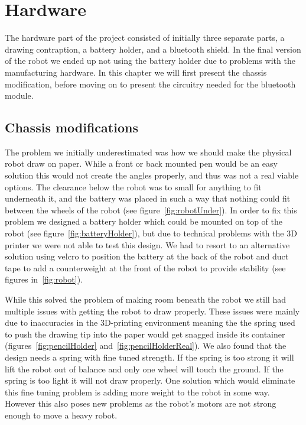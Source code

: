 \section{Hardware}\label{ch:hardware}
The hardware part of the project consisted of initially three separate parts, a drawing contraption, a battery holder, and a bluetooth shield. 
In the final version of the robot we ended up not using the battery holder due to problems with the manufacturing hardware. 
In this chapter we will first present the chassis modification, before moving on to present the circuitry needed for the bluetooth module. 

\subsection*{Chassis modifications}
The problem we initially underestimated was how we should make the physical robot draw on paper. While a front or back mounted pen would be an easy solution this would not create the angles properly, and thus was not a real viable options. The clearance below the robot was to small for anything to fit underneath it, and the battery was placed in such a way that nothing could fit between the wheels of the robot (see figure~\ref{fig:robotUnder}). In order to fix this problem we designed a battery holder which could be mounted on top of the robot (see figure~\ref{fig:batteryHolder}), but due to technical problems with the 3D printer we were not able to test this design. We had to resort to an alternative solution using velcro to position the battery at the back of the robot and duct tape to add a counterweight at the front of the robot to provide stability (see figures in~\ref{fig:robot}). 

\bigskip\noindent
While this solved the problem of making room beneath the robot we still had multiple issues with getting the robot to draw properly. These issues were mainly due to inaccuracies in the 3D-printing environment meaning the the spring used to push the drawing tip into the paper would get snagged inside its container (figures~\ref{fig:pencilHolder} and~\ref{fig:pencilHolderReal}). We also found that the design needs a spring with fine tuned strength. If the spring is too strong it will lift the robot out of balance and only one wheel will touch the ground. If the spring is too light it will not draw properly. One solution which would eliminate this fine tuning problem is adding more weight to the robot in some way. However this also poses new problems as the robot's motors are not strong enough to move a heavy robot. 


